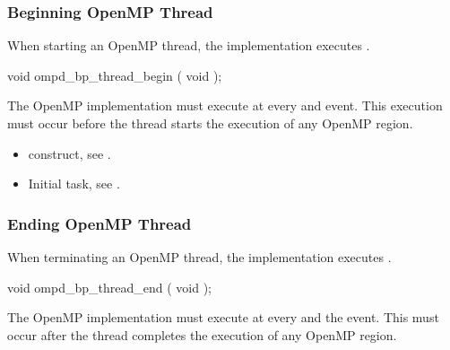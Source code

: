 \subsubsection{Beginning OpenMP Thread}
\label{subsubsec:ompd_bp_thread_begin}

\summary
When starting an OpenMP thread, the implementation executes
.

\format
\begin{cspecific}
\begin{ompSyntax}
void ompd_bp_thread_begin ( void );
\end{ompSyntax}
\end{cspecific}

\descr
The OpenMP implementation must execute  at 
every  and  event.
This execution must occur before the thread starts the execution of 
any OpenMP region.

\crossreferences
\begin{itemize}
\item {} construct, see .

\item Initial task, see .
\end{itemize}



\subsubsection{Ending OpenMP Thread}
\label{subsubsec:ompd_bp_thread_end}

\summary
When terminating an OpenMP thread, the implementation 
executes .

\format
\begin{cspecific}
\begin{ompSyntax}
void ompd_bp_thread_end ( void );
\end{ompSyntax}
\end{cspecific}


\descr

The OpenMP implementation must execute 
 at every  and the  event.
This must occur after the thread completes the execution of any OpenMP region.

